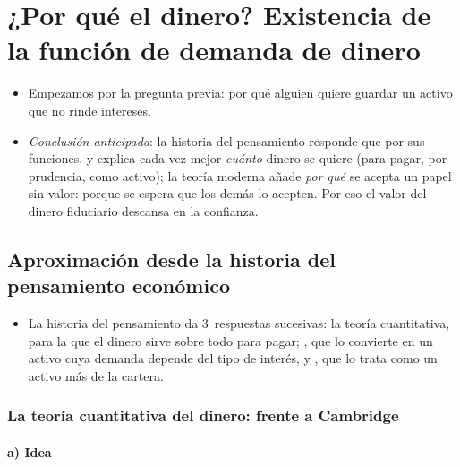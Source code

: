 \documentclass[11pt]{article}
\begin{document}
\section{¿Por qué el dinero? Existencia de la función\cortetitulo{} de demanda de dinero}\label{sec:por-que-dinero}

\begin{itemize}
\item Empezamos por la pregunta previa: por qué alguien quiere guardar un activo que no rinde intereses.
\item \emph{Conclusión anticipada}: la historia del pensamiento responde que por sus funciones, y explica cada vez mejor \emph{cuánto} dinero se quiere (para pagar, por prudencia, como activo); la teoría moderna añade \emph{por qué} se acepta un papel sin valor: porque se espera que los demás lo acepten. Por eso el valor del dinero fiduciario descansa en la confianza.
\end{itemize}

\subsection{Aproximación desde la historia del pensamiento económico}\label{sec:pensamiento}

\begin{itemize}
\item La historia del pensamiento da 3~respuestas sucesivas: la teoría cuantitativa, para la que el dinero sirve sobre todo para pagar; , que lo convierte en un activo cuya demanda depende del tipo de interés, y , que lo trata como un activo más de la cartera.
\end{itemize}

\subsubsection{La teoría cuantitativa del dinero:  frente a Cambridge}\label{sec:cuantitativa}

\paragraph{a) Idea}
\end{document}
